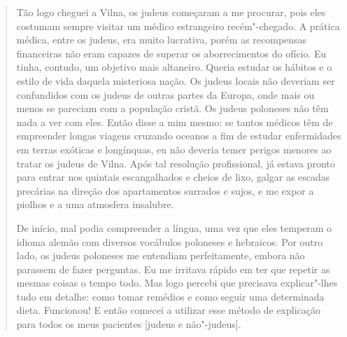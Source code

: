 \begin{quote}
Tão logo cheguei a Vilna, os judeus começaram a me procurar, pois eles
costumam sempre visitar um médico estrangeiro recém"-chegado. A prática
médica, entre os judeus, era muito lucrativa, porém as recompensas
financeiras não eram capazes de superar os aborrecimentos do ofício. Eu
tinha, contudo, um objetivo mais altaneiro. Queria estudar os hábitos e
o estilo de vida daquela misteriosa nação. Os judeus locais não deveriam
ser confundidos com os judeus de outras partes da Europa, onde mais ou
menos se pareciam com a população cristã. Os judeus poloneses não têm
nada a ver com eles. Então disse a mim mesmo: se tantos médicos têm de
empreender longas viagens cruzando oceanos a fim de estudar enfermidades
em terras exóticas e longínquas, eu não deveria temer perigos menores ao
tratar os judeus de Vilna. Após tal resolução profissional, já estava
pronto para entrar nos quintais escangalhados e cheios de lixo, galgar
as escadas precárias na direção dos apartamentos surrados e sujos, e me
expor a piolhos e a uma atmosfera insalubre.

De início, mal podia compreender a língua, uma vez que eles temperam o
idioma alemão com diversos vocábulos poloneses e hebraicos. Por outro
lado, os judeus poloneses me entendiam perfeitamente, embora não
parassem de fazer perguntas. Eu me irritava rápido em ter que repetir as
mesmas coisas o tempo todo. Mas logo percebi que precisava explicar"-lhes
tudo em detalhe: como tomar remédios e como seguir uma determinada
dieta. Funcionou! E então comecei a utilizar esse método de explicação
para todos os meus pacientes {[}judeus e não"-judeus{]}.


\end{quote}
